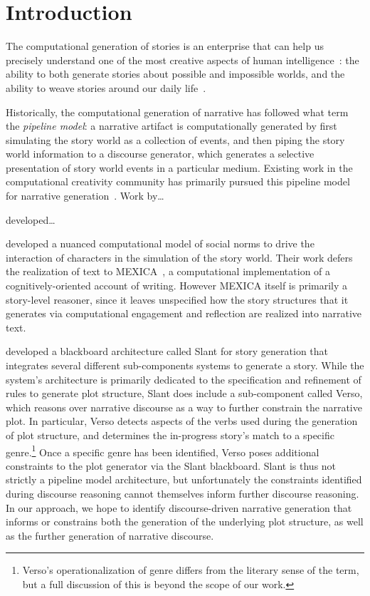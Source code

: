 \section{Introduction}

The computational generation of stories is an enterprise that can help us
precisely understand one of the most creative aspects of human
intelligence~\cite{boyd2009origin}: the ability to both generate stories about
possible and impossible worlds, and the ability to weave stories around our
daily life~\cite{herman2013storytelling}.

Historically, the computational generation of narrative has followed what
 term the \emph{pipeline model}: a narrative artifact is
computationally generated by first simulating the story world as a collection of
events, and then piping the story world information to a discourse generator,
which generates a selective presentation of story world events in a particular
medium. Existing work in the computational creativity community has primarily
pursued this pipeline model for narrative
generation~\cite{gervas2009computational}. Work by\ldots



 developed\ldots


 developed a nuanced computational model of social
norms to drive the interaction of characters in the simulation of the story
world. Their work defers the realization of text to
MEXICA~\cite{perez2001mexica}, a computational implementation of a
cognitively-oriented account of writing. However MEXICA itself is primarily a
story-level reasoner, since it leaves unspecified how the story structures that
it generates via computational engagement and reflection are realized into
narrative text.

 developed a blackboard architecture called Slant for
story generation that integrates several different sub-components systems to
generate a story. While the system's architecture is primarily dedicated to the
specification and refinement of rules to generate plot structure, Slant does
include a sub-component called Verso, which reasons over narrative discourse as
a way to further constrain the narrative plot. In particular, Verso detects
aspects of the verbs used during the generation of plot structure, and
determines the in-progress story's match to a specific genre.\footnote{Verso's
operationalization of genre differs from the literary sense of the term, but a
full discussion of this is beyond the scope of our work.} Once a specific genre
has been identified, Verso poses additional constraints to the plot generator
via the Slant blackboard. Slant is thus not strictly a pipeline model
architecture, but unfortunately the constraints identified during discourse
reasoning cannot themselves inform further discourse reasoning. In our approach,
we hope to identify discourse-driven narrative generation that informs or
constrains both the generation of the underlying plot structure, as well as the
further generation of narrative discourse.

